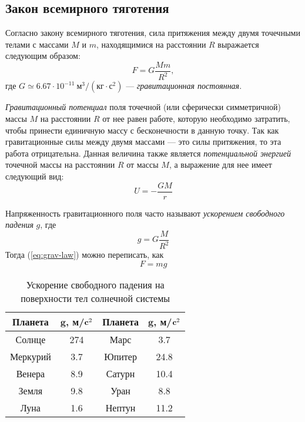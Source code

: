 \subsection{Закон всемирного тяготения}
Согласно закону всемирного тяготения, сила притяжения 
между двумя точечными телами с массами $M$ и $m$,
находящимися на расстоянии $R$ выражается следующим
образом:\begin{equation}
	F=G\frac{Mm}{R^2}, \label{eq:grav-law}
\end{equation}
где $G\simeq 6.67\cdot 10^{-11}~\text{м}^3 / 
\left( \text{кг} \cdot \text{с}^2 \right)$ --- 
{\itshape гравитационная постоянная}.

{\itshape Гравитационный потенциал} поля точечной (или сферически 
симметричной) массы $M$ на расстоянии $R$ от нее равен
работе, которую необходимо затратить, чтобы принести
единичную массу с бесконечности в данную точку. Так как
гравитационные силы между двумя массами --- это силы 
притяжения, то эта работа отрицательна. Данная
величина также является {\itshape потенциальной энергией} точечной
массы на расстоянии $R$ от массы $M$, а выражение для нее имеет 
следующий вид:\begin{equation}
U=-\frac{GM}{r}
\end{equation}

Напряженность гравитационного поля часто называют 
{\itshape ускорением свободного падения} $g$, где\begin{equation}
	g = G \frac{M}{R^2}
\end{equation}
Тогда (\ref{eq:grav-law}) можно переписать, как \begin{equation}
	F = mg
\end{equation}
\begin{table}[h!]
\centering
\begin{tabular}{|c|c|c|c|}
\hline 
{\bfseries Планета} & $\mathbf{g}$, 
{\bfseries м/$\text{\bfseries c}^2$} 
& {\bfseries Планета} & $\mathbf{g}$, 
{\bfseries м/$\text{\bfseries c}^2$}\\
\hline
Солнце & 274 & Марс & 3.7\\
\hline
Меркурий & 3.7 & Юпитер & 24.8\\
\hline
Венера & 8.9 & Сатурн & 10.4\\
\hline
Земля & 9.8 & Уран & 8.8\\
\hline
Луна & 1.6 & Нептун & 11.2\\
\hline
\end{tabular}
\caption{Ускорение свободного падения на поверхности тел 
солнечной системы}
\end{table}